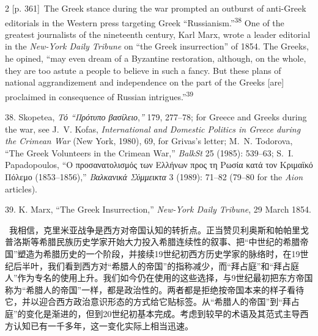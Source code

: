 \documentclass[10pt,a4paper]{article}
\begin{document}
\begin{paracol}{2}
\switchcolumn
{\scriptsize\color{gray}[p. 361]}\ The Greek stance during the war prompted an outburst of anti-Greek editorials in the Western press targeting Greek “Russianism.”\nobreak\textsuperscript{38} One of the greatest journalists of the nineteenth century, Karl Marx, wrote a leader editorial in the \textit{New-York Daily Tribune} on “the Greek insurrection” of 1854. The Greeks, he opined, “may even dream of a Byzantine restoration, although, on the whole, they are too astute a people to believe in such a fancy. But these plans of national aggrandizement and independence on the part of the Greeks [are] proclaimed in consequence of Russian intrigues.”\nobreak\textsuperscript{39}\par{\small 38. Skopetea, \textit{Τό “Πρότυπο βασίλειο},\textit{”} 179, 277–78; for Greece and Greeks during the war, see J. V. Kofas, \textit{International and Domestic Politics in Greece during the Crimean War} (New York, 1980), 69, for Grivas’s letter; M. N. Todorova, “The Greek Volunteers in the Crimean War,” \textit{BalkSt} 25 (1985): 539–63; S. I. Papadopoulos, “Ο προσανατολισμός των Ελλήνων προς τη Ρωσία κατά τον Κριμαϊκό Πόλεμο (1853–1856),” \textit{Βαλκανικά Σύμμεικτα} 3 (1989): 71–82 (79–80 for the \textit{Aion} articles).\par}{\small 39. K. Marx, “The Greek Insurrection,” \textit{New-York Daily Tribune},\textit{ }29 March 1854.\par}
\switchcolumn*
{\scriptsize\color{gray}[p. 361–362]}\ 我相信，克里米亚战争是西方对帝国认知的转折点。正当赞贝利奥斯和帕帕里戈普洛斯等希腊民族历史学家开始大力投入希腊连续性的叙事、把“中世纪的希腊帝国”塑造为希腊历史的一个阶段，并接续19世纪初西方历史学家的脉络时，在19世纪后半叶，我们看到西方对“希腊人的帝国”的指称减少，而“拜占庭”和“拜占庭人”作为专名的使用上升。我们如今仍在使用的这些选择，与9世纪最初把东方帝国称为“希腊人的帝国”一样，都是政治性的。两者都是拒绝按帝国本来的样子看待它，并以迎合西方政治意识形态的方式给它贴标签。从“希腊人的帝国”到“拜占庭”的变化是渐进的，但到20世纪初基本完成。考虑到较早的术语及其范式主导西方认知已有一千多年，这一变化实际上相当迅速。\par
\switchcolumn

\end{paracol}
\end{document}
